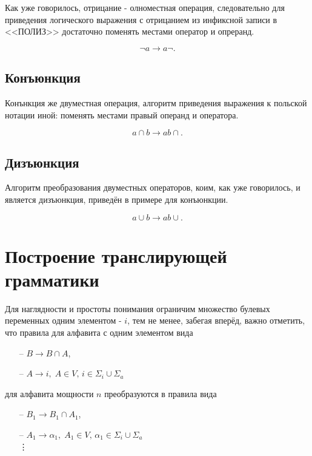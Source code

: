 \documentclass[12pt]{extarticle}
\begin{document}
\begin{sloppypar}
	Как уже говорилось, отрицание - олноместная операция, следовательно для приведения логического выражения с отрицанием из инфиксной записи в <<ПОЛИЗ>> достаточно поменять местами оператор и опреранд.
	
	\[
		\neg a \longrightarrow a \neg .
	\]
	
	\subsection{Конъюнкция}
	
	Конънкция же двуместная операция, алгоритм приведения выражения к польской нотации иной: поменять местами правый операнд и оператора.
	
	\[
		a \cap b \longrightarrow a b \cap.
	\]
	
	\subsection{Дизъюнкция}
	
	Алгоритм преобразования двуместных операторов, коим, как уже говорилось, и является дизъюнкция, приведён в примере для конъюнкции.
	
	\[
		a \cup b \longrightarrow a b \cup.
	\]
	
	\section{Построение транслирующей грамматики}
	
	Для наглядности и простоты понимания ограничим множество булевых переменных одним элементом - $i$, тем не менее, забегая вперёд, важно отметить, что правила для алфавита с одним элементом вида 
	
	\begin{itemize}
		\item[--] $B \rightarrow B \cap A$,
		\item[--] $A \rightarrow i, \; A \in V, \, i \in \Sigma_i \cup \Sigma_a$
	\end{itemize}
	
	для алфавита мощности $n$ преобразуются в правила вида
	
	\begin{itemize}
		\item[--] $B_1 \rightarrow B_1 \cap A_1$,
		\item[--] $A_1 \rightarrow \alpha_1, \; A_1 \in V, \, \alpha_1 \in \Sigma_i \cup \Sigma_a$  \\
		
		\hfil \vdots


\end{itemize}
\end{sloppypar}
\end{document}
